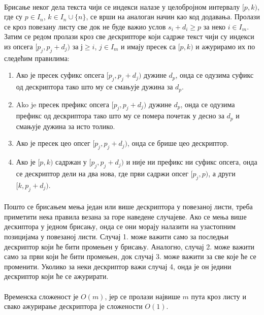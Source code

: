 \documentclass[12pt,oneside]{memoir}
\begin{document}
\paragraph{}
Брисање неког дела текста чији се индекси налазе у целобројном интервалу \([p, k)\), где су 
\(p \in I_n\), \(k \in I_n \cup \{n\}\), се врши на аналоган начин као код додавања. 
Пролази се кроз повезану листу све док не буде важио услов \(s_i + d_i \geq p\) за неко 
\(i \in I_m\). Затим се редом пролази кроз све дескрипторе који садрже текст чији су индекси из опсега
 \([p_j, p_j+d_j)\) за \(ј \geq i\), \(j \in I_m\) и  имају пресек са \([p, k)\) и ажурирамо 
 их по следећим правилима:

\begin{enumerate}
	\item Ако је пресек суфикс опсега \([p_j, p_j+d_j)\) дужине \(d_p\), онда се одузима суфикс 
	од дескриптора тако што му се смањује дужина за \(d_p\).
	
	\item Ako je пресек префикс опсега \([p_j, p_j+d_j)\) дужине \(d_p\), онда се одузима префикс
	 од дескриптора тако што му се помера почетак у десно за \(d_p\) и смањује дужина за исто
	 толико.
	 
	\item Ако је пресек цео опсег \([p_j, p_j+d_j)\), онда се брише цео дескриптор.
	 
	\item Ако је \([p, k)\) садржан у \([p_j, p_j+d_j)\) и није ни префикс ни суфикс опсега,
	онда се дескриптор дели на два нова, где први садржи опсег \([p_j, p)\), а други 
	\([k, p_j+d_j)\).
\end{enumerate}
\paragraph{}
Пошто се брисањем мења један или више дескриптора у повезаној листи, треба
приметити нека правила везана за горе наведене случајеве. Ако се мења више дескиптора
у једном брисању, онда се они морају налазити на узастопним позицијама у повезаној листи.
Случај 1. може важити само за последњи дескриптор који ће бити промењен у брисању.
Аналогно, случај 2. може важити само за први који ће бити промењен, док случај 3. 
може важити за све које ће се променити. Уколико за неки дескриптор важи случај 4, 
онда је он једини дескриптор који ће се ажурирати.

\paragraph{}
Временска сложеност је \(O(m)\), јер се пролази највише \(m\) пута кроз листу и свако
ажурирање дескриптора је сложености \(O(1)\).
\end{document}
